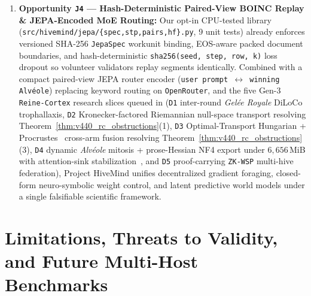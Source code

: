 \documentclass[11pt,a4paper]{article}
\begin{document}
\begin{enumerate}[leftmargin=1.8em]
    \item \textbf{Opportunity \texttt{J4} --- Hash-Deterministic Paired-View BOINC Replay \& JEPA-Encoded MoE Routing:} Our opt-in CPU-tested library (\texttt{src/hivemind/jepa/\{spec,stp,pairs,hf\}.py}, 9 unit tests) already enforces versioned SHA-256 \texttt{JepaSpec} workunit binding, EOS-aware packed document boundaries, and hash-deterministic \texttt{sha256(seed, step, row, k)} loss dropout so volunteer validators replay segments identically. Combined with a compact paired-view JEPA router encoder (\texttt{user prompt $\leftrightarrow$ winning Alv\'eole}) replacing keyword routing on \texttt{OpenRouter}, and the five Gen-3 \texttt{Reine-Cortex} research slices queued in  (\texttt{D1} inter-round \emph{Gel\'ee Royale} DiLoCo trophallaxis, \texttt{D2} Kronecker-factored Riemannian null-space transport resolving Theorem~\ref{thm:v440_rc_obstructions}(1), \texttt{D3} Optimal-Transport Hungarian + Procrustes~\cite{ainsworth2022gitrebasin} cross-arm fusion resolving Theorem~\ref{thm:v440_rc_obstructions}(3), \texttt{D4} dynamic \emph{Alv\'eole} mitosis + prose-Hessian NF4 export under $6{,}656$\,MiB with attention-sink stabilization~\cite{xiao2023streamingllm}, and \texttt{D5} proof-carrying \texttt{ZK-WSP} multi-hive federation), Project HiveMind unifies decentralized gradient foraging, closed-form neuro-symbolic weight control, and latent predictive world models under a single falsifiable scientific framework.
\end{enumerate}

\section{Limitations, Threats to Validity, and Future Multi-Host Benchmarks}
\label{sec:limitations}
\end{document}
